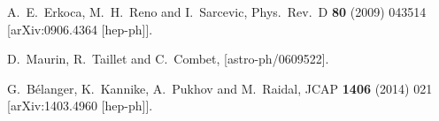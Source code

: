 \documentclass[12pt,a4paper]{article}
\begin{document}
\begin{thebibliography}{}
  A.~E.~Erkoca, M.~H.~Reno and I.~Sarcevic,
  Phys.\ Rev.\ D {\bf 80} (2009) 043514
  [arXiv:0906.4364 [hep-ph]].

  D.~Maurin, R.~Taillet and C.~Combet,
  [astro-ph/0609522].

  G.~Bélanger, K.~Kannike, A.~Pukhov and M.~Raidal,
  JCAP {\bf 1406} (2014) 021
  [arXiv:1403.4960 [hep-ph]].

  
\end{thebibliography}
\end{document}
